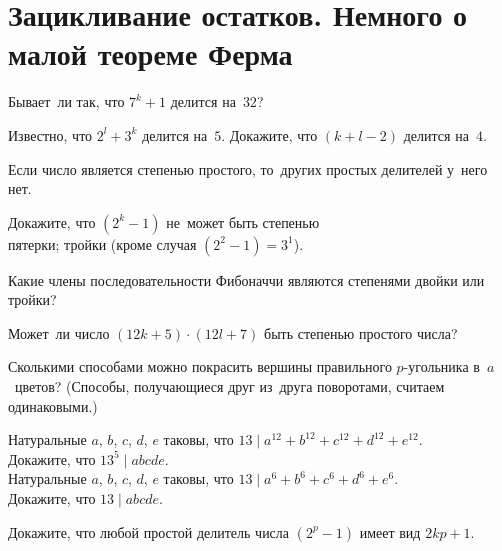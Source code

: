 

\section*{Зацикливание остатков. Немного о малой теореме Ферма}


\begingroup
    \def\divides{\mathrel{\vert}}

\begin{problems}

Бывает~ли так, что $7^k + 1$ делится на~$32$?

\item
Известно, что $2^l + 3^k$ делится на~$5$.
Докажите, что $(k + l - 2)$ делится на~$4$.

\end{problems}

Если число является степенью простого, то~других простых делителей у~него нет.

\begin{problems}

\item
Докажите, что $(2^k - 1)$ не~может быть степенью
\\
\subproblem пятерки;
\quad
\subproblem тройки (кроме случая $(2^2 - 1) = 3^1$).

\item
Какие члены последовательности Фибоначчи являются степенями двойки или тройки?

\item
Может~ли число $(12 k + 5) \cdot (12 l + 7)$ быть степенью простого числа?

\item{}
Сколькими способами можно покрасить вершины правильного $p$-угольника
в~$a$~цветов?
(Способы, получающиеся друг из~друга поворотами, считаем одинаковыми.)

\item
\subproblem
Натуральные $a$, $b$, $c$, $d$, $e$ таковы, что
\(
    13 \divides a^{12} + b^{12} + c^{12} + d^{12} + e^{12}
\).\\
Докажите, что $13^5 \divides a b c d e$.
\\
\subproblem
Натуральные $a$, $b$, $c$, $d$, $e$ таковы, что
\(
    13 \divides a^{6} + b^{6} + c^{6} + d^{6} + e^{6}
\).\\
Докажите, что $13 \divides a b c d e$.

\item
Докажите, что любой простой делитель числа $(2^p - 1)$ имеет вид $2 k p + 1$.

\end{problems}

\endgroup %

